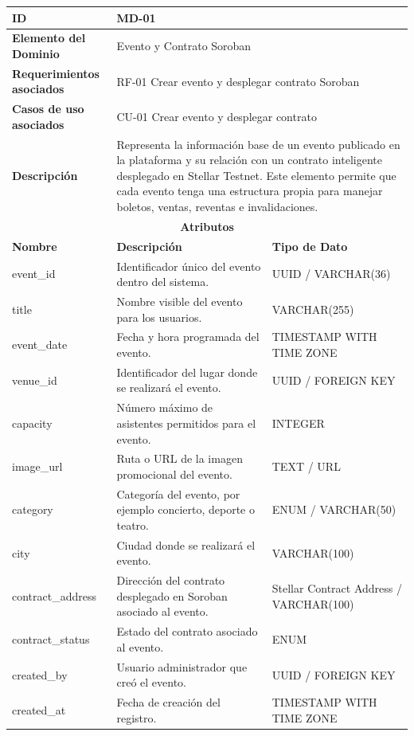 \documentclass[12pt,letterpaper]{article}
\begin{document}
\begin{table}[H]
\centering
\scriptsize
\renewcommand{\arraystretch}{1.12}
\setlength{\tabcolsep}{4pt}

\begin{tabularx}{\textwidth}{|p{3.2cm}|X|p{3.5cm}|}
\hline
\textbf{ID} & MD-01 & \\ \hline

\textbf{Elemento del Dominio} & 
\multicolumn{2}{X|}{Evento y Contrato Soroban} \\ \hline

\textbf{Requerimientos asociados} & 
\multicolumn{2}{X|}{RF-01 Crear evento y desplegar contrato Soroban} \\ \hline

\textbf{Casos de uso asociados} & 
\multicolumn{2}{X|}{CU-01 Crear evento y desplegar contrato} \\ \hline

\textbf{Descripción} & 
\multicolumn{2}{X|}{Representa la información base de un evento publicado en la plataforma y su relación con un contrato inteligente desplegado en Stellar Testnet. Este elemento permite que cada evento tenga una estructura propia para manejar boletos, ventas, reventas e invalidaciones.} \\ \hline

\multicolumn{3}{|c|}{\textbf{Atributos}} \\ \hline

\textbf{Nombre} & \textbf{Descripción} & \textbf{Tipo de Dato} \\ \hline

event\_id & Identificador único del evento dentro del sistema. & UUID / VARCHAR(36) \\ \hline
title & Nombre visible del evento para los usuarios. & VARCHAR(255) \\ \hline
event\_date & Fecha y hora programada del evento. & TIMESTAMP WITH TIME ZONE \\ \hline
venue\_id & Identificador del lugar donde se realizará el evento. & UUID / FOREIGN KEY \\ \hline
capacity & Número máximo de asistentes permitidos para el evento. & INTEGER \\ \hline
image\_url & Ruta o URL de la imagen promocional del evento. & TEXT / URL \\ \hline
category & Categoría del evento, por ejemplo concierto, deporte o teatro. & ENUM / VARCHAR(50) \\ \hline
city & Ciudad donde se realizará el evento. & VARCHAR(100) \\ \hline
contract\_address & Dirección del contrato desplegado en Soroban asociado al evento. & Stellar Contract Address / VARCHAR(100) \\ \hline
contract\_status & Estado del contrato asociado al evento. & ENUM \\ \hline
created\_by & Usuario administrador que creó el evento. & UUID / FOREIGN KEY \\ \hline
created\_at & Fecha de creación del registro. & TIMESTAMP WITH TIME ZONE \\ \hline


\end{tabularx}
\end{table}
\end{document}
